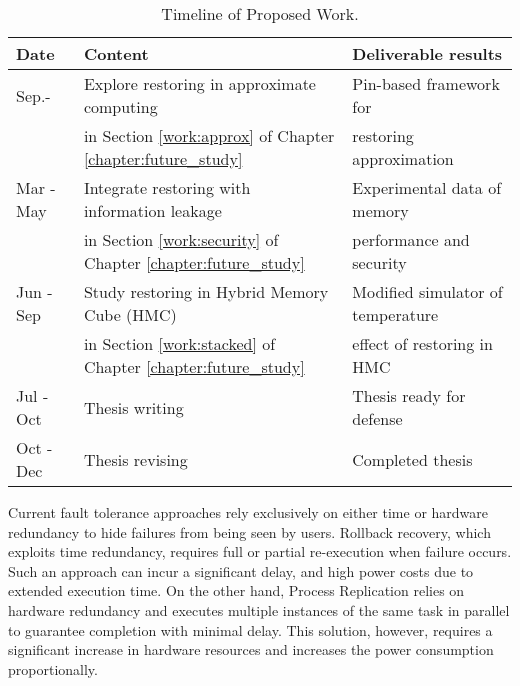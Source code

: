 \begin{table}[ht]
\vspace{-0.3in}
\caption{Timeline of Proposed Work.}
\vspace{-0.15in}
\centering
\scalebox{0.85}
{
\begin{tabular}{|l|l|l|}
\hline
\textbf{Date} & \textbf{Content} & \textbf{Deliverable results} \\
\hline
Sep.-   & Explore restoring in approximate computing & Pin-based framework for \\
 & in Section \ref{work:approx} of Chapter \ref{chapter:future_study}& restoring approximation \\
\hline
Mar - May  & Integrate restoring with information leakage & Experimental data of memory\\%
 & in Section \ref{work:security} of Chapter \ref{chapter:future_study}& performance and security\\
\hline
Jun - Sep & Study restoring in Hybrid Memory Cube (HMC) & Modified simulator of temperature\\
 & in Section \ref{work:stacked} of Chapter \ref{chapter:future_study}&  effect of restoring in HMC \\
\hline
Jul - Oct  & Thesis writing & Thesis ready for defense \\
\hline
Oct - Dec & Thesis revising & Completed thesis \\
\hline
\end{tabular}
}
\label{tab:timeline}
\end{table}





Current fault tolerance approaches rely exclusively on either time or hardware redundancy to hide failures from being seen by users. 
Rollback recovery, which exploits time redundancy, requires full or partial re-execution when failure occurs.  
Such an approach
can incur a significant delay, %
and high power costs due to extended execution time.
On the other hand, Process Replication relies on hardware redundancy and executes multiple
instances of the same task in parallel to guarantee completion with minimal delay. 
This solution, however, requires a significant increase in hardware resources and increases the power consumption proportionally. 
